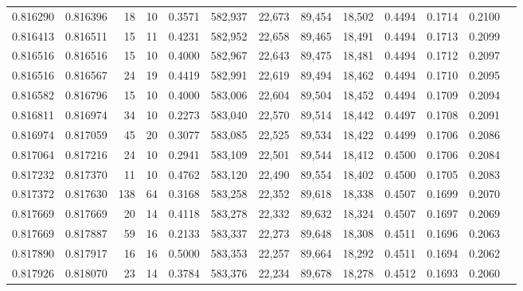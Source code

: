 \begin{tabular}{rrrrrrrrrrrrr}
0.816290 & 0.816396 &    18 &  10 &                                     0.3571 & 582,937 &  22,673 &  89,454 &  18,502 & 0.4494 & 0.1714 & 0.2100 \\
0.816413 & 0.816511 &    15 &  11 &                                     0.4231 & 582,952 &  22,658 &  89,465 &  18,491 & 0.4494 & 0.1713 & 0.2099 \\
0.816516 & 0.816516 &    15 &  10 &                                     0.4000 & 582,967 &  22,643 &  89,475 &  18,481 & 0.4494 & 0.1712 & 0.2097 \\
0.816516 & 0.816567 &    24 &  19 &                                     0.4419 & 582,991 &  22,619 &  89,494 &  18,462 & 0.4494 & 0.1710 & 0.2095 \\
0.816582 & 0.816796 &    15 &  10 &                                     0.4000 & 583,006 &  22,604 &  89,504 &  18,452 & 0.4494 & 0.1709 & 0.2094 \\
0.816811 & 0.816974 &    34 &  10 &                                     0.2273 & 583,040 &  22,570 &  89,514 &  18,442 & 0.4497 & 0.1708 & 0.2091 \\
0.816974 & 0.817059 &    45 &  20 &                                     0.3077 & 583,085 &  22,525 &  89,534 &  18,422 & 0.4499 & 0.1706 & 0.2086 \\
0.817064 & 0.817216 &    24 &  10 &                                     0.2941 & 583,109 &  22,501 &  89,544 &  18,412 & 0.4500 & 0.1706 & 0.2084 \\
0.817232 & 0.817370 &    11 &  10 &                                     0.4762 & 583,120 &  22,490 &  89,554 &  18,402 & 0.4500 & 0.1705 & 0.2083 \\
0.817372 & 0.817630 &   138 &  64 &                                     0.3168 & 583,258 &  22,352 &  89,618 &  18,338 & 0.4507 & 0.1699 & 0.2070 \\
0.817669 & 0.817669 &    20 &  14 &                                     0.4118 & 583,278 &  22,332 &  89,632 &  18,324 & 0.4507 & 0.1697 & 0.2069 \\
0.817669 & 0.817887 &    59 &  16 &                                     0.2133 & 583,337 &  22,273 &  89,648 &  18,308 & 0.4511 & 0.1696 & 0.2063 \\
0.817890 & 0.817917 &    16 &  16 &                                     0.5000 & 583,353 &  22,257 &  89,664 &  18,292 & 0.4511 & 0.1694 & 0.2062 \\
0.817926 & 0.818070 &    23 &  14 &                                     0.3784 & 583,376 &  22,234 &  89,678 &  18,278 & 0.4512 & 0.1693 & 0.2060 \\

\end{tabular}
